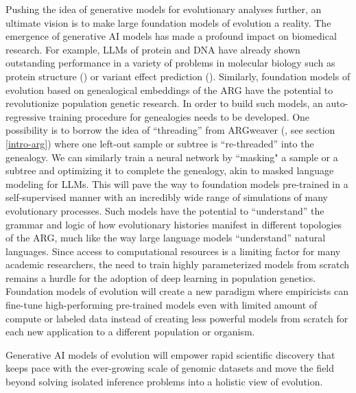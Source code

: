 Pushing the idea of generative models for evolutionary analyses further, an ultimate vision is to make large foundation models of evolution a reality. The emergence of generative \ac{AI} models has made a profound impact on biomedical research. For example, \acp{LLM} of protein and DNA have already shown outstanding performance in a variety of problems in molecular biology such as protein structure (\cite{lin2023evolutionary}) or variant effect prediction (\cite{benegas2023dna,cheng2023accurate}). Similarly, foundation models of evolution based on genealogical embeddings of the \ac{ARG} have the potential to revolutionize population genetic research. In order to build such models, an auto-regressive training procedure for genealogies needs to be developed. One possibility is to borrow the idea of “threading” from ARGweaver (\cite{rasmussen_genome-wide_2014,hubisz_mapping_2020}, see section \ref{intro-arg}) where one left-out sample or subtree is “re-threaded” into the genealogy. We can similarly train a neural network by ``masking" a sample or a subtree and optimizing it to complete the genealogy, akin to masked language modeling for \acp{LLM}. This will pave the way to foundation models pre-trained in a self-supervised manner with an incredibly wide range of simulations of many evolutionary processes. Such models have the potential to “understand” the grammar and logic of how evolutionary histories manifest in different topologies of the \ac{ARG}, much like the way large language models “understand” natural languages. Since access to computational resources is a limiting factor for many academic researchers, the need to train highly parameterized models from scratch remains a hurdle for the adoption of deep learning in population genetics. Foundation models of evolution will create a new paradigm where empiricists can fine-tune high-performing pre-trained models even with limited amount of compute or labeled data instead of creating less powerful models from scratch for each new application to a different population or organism.

Generative \ac{AI} models of evolution will empower rapid scientific discovery that keeps pace with the ever-growing scale of genomic datasets and move the field beyond solving isolated inference problems into a holistic view of evolution.

